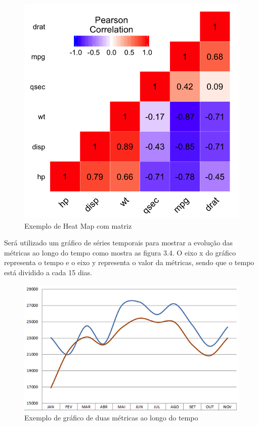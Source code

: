 \begin{figure}[H]
	\captionsetup{justification=centering}
	\centerline{\includegraphics[scale=0.3]{heatmap.png}}
	\caption{Exemplo de Heat Map com matriz}
	\label{figura:heatmap}
\end{figure}

Será utilizado um gráfico de séries temporais para mostrar a evolução das métricas ao longo do tempo como mostra as figura 3.4. O eixo x do gráfico representa o tempo e o eixo y representa o valor da métricas, sendo que o tempo está dividido a cada 15 dias.

\begin{figure}[H]
	\captionsetup{justification=centering}
	\centerline{\includegraphics[scale=0.5]{metricaex.png}}
	\caption{Exemplo de gráfico de duas métricas ao longo do tempo}
	\label{figura:exmetrica}
\end{figure}

